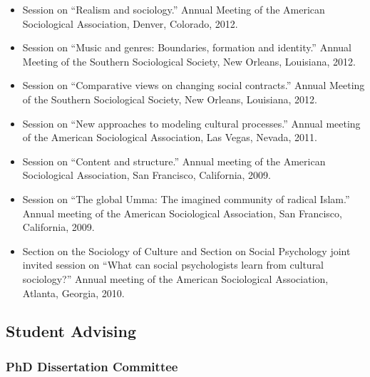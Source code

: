 \documentclass[
]{article}
\begin{document}
\begin{itemize}
\item
  Session on ``Realism and sociology.'' Annual Meeting of the American
  Sociological Association, Denver, Colorado, 2012.
\item
  Session on ``Music and genres: Boundaries, formation and identity.''
  Annual Meeting of the Southern Sociological Society, New Orleans,
  Louisiana, 2012.
\item
  Session on ``Comparative views on changing social contracts.'' Annual
  Meeting of the Southern Sociological Society, New Orleans, Louisiana,
  2012.
\item
  Session on ``New approaches to modeling cultural processes.'' Annual
  meeting of the American Sociological Association, Las Vegas, Nevada,
  2011.
\item
  Session on ``Content and structure.'' Annual meeting of the American
  Sociological Association, San Francisco, California, 2009.
\item
  Session on ``The global Umma: The imagined community of radical
  Islam.'' Annual meeting of the American Sociological Association, San
  Francisco, California, 2009.
\item
  Section on the Sociology of Culture and Section on Social Psychology
  joint invited session on ``What can social psychologists learn from
  cultural sociology?'' Annual meeting of the American Sociological
  Association, Atlanta, Georgia, 2010.
\end{itemize}

\subsection{Student Advising}\label{student-advising}

\subsubsection{PhD Dissertation
Committee}\label{phd-dissertation-committee}
\end{document}
